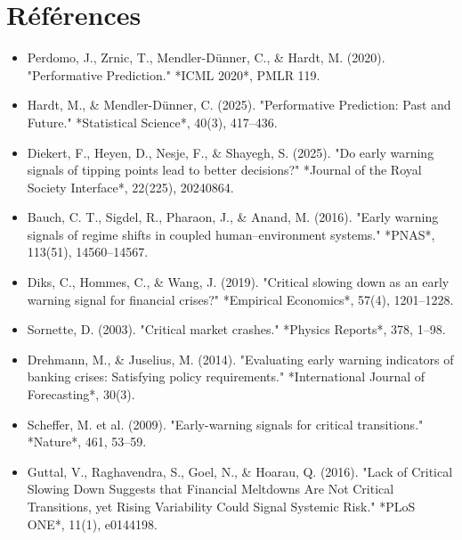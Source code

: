 \documentclass[11pt,a4paper]{article}
\begin{document}
\section*{Références}
\begin{itemize}[leftmargin=1.2em]
\item Perdomo, J., Zrnic, T., Mendler-Dünner, C., \& Hardt, M. (2020). "Performative Prediction." *ICML 2020*, PMLR 119.
\item Hardt, M., \& Mendler-Dünner, C. (2025). "Performative Prediction: Past and Future." *Statistical Science*, 40(3), 417–436.
\item Diekert, F., Heyen, D., Nesje, F., \& Shayegh, S. (2025). "Do early warning signals of tipping points lead to better decisions?" *Journal of the Royal Society Interface*, 22(225), 20240864.
\item Bauch, C. T., Sigdel, R., Pharaon, J., \& Anand, M. (2016). "Early warning signals of regime shifts in coupled human–environment systems." *PNAS*, 113(51), 14560–14567.
\item Diks, C., Hommes, C., \& Wang, J. (2019). "Critical slowing down as an early warning signal for financial crises?" *Empirical Economics*, 57(4), 1201–1228.
\item Sornette, D. (2003). "Critical market crashes." *Physics Reports*, 378, 1–98.
\item Drehmann, M., \& Juselius, M. (2014). "Evaluating early warning indicators of banking crises: Satisfying policy requirements." *International Journal of Forecasting*, 30(3).
\item Scheffer, M. et al. (2009). "Early-warning signals for critical transitions." *Nature*, 461, 53–59.
\item Guttal, V., Raghavendra, S., Goel, N., \& Hoarau, Q. (2016). "Lack of Critical Slowing Down Suggests that Financial Meltdowns Are Not Critical Transitions, yet Rising Variability Could Signal Systemic Risk." *PLoS ONE*, 11(1), e0144198.
\end{itemize}
\end{document}
